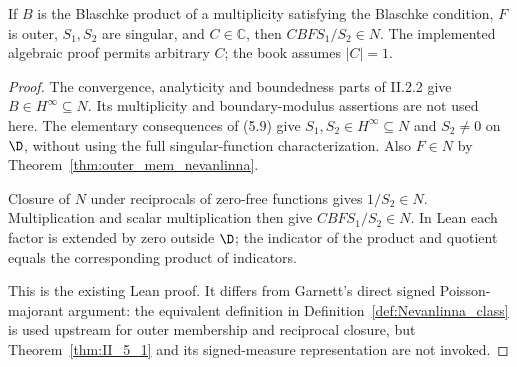 \begin{theorem}
  \label{thm:nevanlinna_factorization_converse}
  \leanok
  \mainline
  If $B$ is the Blaschke product of a multiplicity satisfying the Blaschke
  condition, $F$ is outer, $S_1,S_2$ are singular, and $C\in\mathbb C$, then
  $CBFS_1/S_2\in N$. The implemented algebraic proof permits arbitrary $C$;
  the book assumes $|C|=1$.
  \begin{proof}
    \leanok
    The convergence, analyticity and boundedness parts of II.2.2 give
    $B\in H^\infty\subseteq N$. Its multiplicity and boundary-modulus assertions
    are not used here. The elementary consequences of (5.9) give
    $S_1,S_2\in H^\infty\subseteq N$ and $S_2\ne0$ on $\D$, without using the
    full singular-function characterization. Also $F\in N$ by
    Theorem~\ref{thm:outer_mem_nevanlinna}.

    Closure of $N$ under reciprocals of zero-free functions gives $1/S_2\in N$.
    Multiplication and scalar multiplication then give $CBFS_1/S_2\in N$.
    In Lean each factor is extended by zero outside $\D$; the indicator of
    the product and quotient equals the corresponding product of indicators.

    This is the existing Lean proof. It differs from Garnett's direct signed
    Poisson-majorant argument: the equivalent definition in Definition~\ref{def:Nevanlinna_class} is used upstream for
    outer membership and reciprocal closure, but Theorem~\ref{thm:II_5_1}
    and its signed-measure representation are not invoked.
  \end{proof}
\end{theorem}

